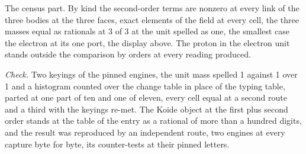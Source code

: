 \begin{chproof}[census]
The census part. By kind the second-order terms are nonzero at every link of the three bodies at the three faces, exact elements of the field at every cell, the three masses equal as rationals at 3 of 3 at the unit spelled as one, the smallest case the electron at its one port, the display above. The proton in the electron unit stands outside the comparison by orders at every reading produced.

\emph{Check.} Two keyings of the pinned engines, the unit mass spelled 1 against 1 over 1 and a histogram counted over the change table in place of the typing table, parted at one part of ten and one of eleven, every cell equal at a second route and a third with the keyings re-met. The Koide object at the first plus second order stands at the table of the entry as a rational of more than a hundred digits, and the result was reproduced by an independent route, two engines at every capture byte for byte, its counter-tests at their pinned letters.
\end{chproof}
\label{chend:VII-5-proton-to-electron-ratio-a-candidate}
\par\medskip{}\label{narr:close:7-5}\par
